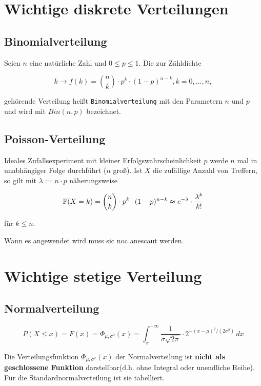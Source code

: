 

\section{Wichtige diskrete Verteilungen}

\subsection{Binomialverteilung}

Seien $n$ eine natürliche Zahl und $0\leq p\leq 1$. Die zur Zähldichte

\[k\longrightarrow f(k)=\binom{n}{k}\cdot p^k\cdot (1-p)^{n-k},k=0,...,n, \]

gehörende Verteilung heißt \texttt{Binomialverteilung} mit den Parametern $n$ und $p$ und wird mit $Bin(n,p)$ bezeichnet.

\subsection{Poisson-Verteilung}

Ideales Zufallsexperiment mit kleiner Erfolgswahrscheinlichkeit $p$ werde $n$ mal in unabhängiger Folge durchführt ($n$ groß). Ist $X$ die zufällige Anzahl von Treffern, so gilt mit $\lambda := n\cdot p$ näherungsweise

\[\mathbb{P} (X=k) = \binom{n}{k}\cdot p^k \cdot (1-p)^{n-k}\thickapprox e^{-\lambda}\cdot \frac{\lambda^k}{k!}  \]

für $k\leq n$.

Wann es angewendet wird muss sic noc anescaut werden.

\section{Wichtige stetige Verteilung}

\subsection{Normalverteilung}

\[P(X\leq x)= F(x)=\Phi_{\mu ,\sigma ^2}(x)=\int_{x}^{-\infty} \frac{1}{\sigma\sqrt{2\pi}}\cdot 2^{-(x-\mu)^2/(2\sigma^2)} \,dx \]

Die Verteilungsfunktion $\Phi_{\mu ,\sigma ^2}(x)$ der Normalverteilung ist \textbf{nicht als geschlossene Funktion} darstellbar(d.h. ohne Integral oder unendliche Reihe). Für die Standardnormalverteilung ist sie tabelliert.

